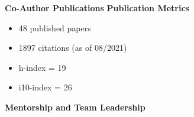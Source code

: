 \documentclass{article}
\begin{document}
{\large  \textbf{Co-Author Publications}}
\vspace{-1em}\vspace{1mm}
\begingroup
  \setlength\bibitemsep{0pt}
  \nocite{*}
  \printbibliography[keyword=coauthor, heading=none]
\endgroup
%
\vspace{0.5em}
%
{\large  \textbf{Publication Metrics}}
\begin{adjustwidth}{5mm}{}
  \begin{multicols}{2}
    \begin{itemize}[noitemsep,topsep=0pt, leftmargin=0mm]
      \item 48 published papers
      \item 1897 citations (as of 08/2021)
      \item h-index = 19
      \item i10-index = 26
    \end{itemize}
  \end{multicols}
\end{adjustwidth}
\vspace{3mm}
{\large  \textbf{Mentorship and Team Leadership}}
\end{document}
